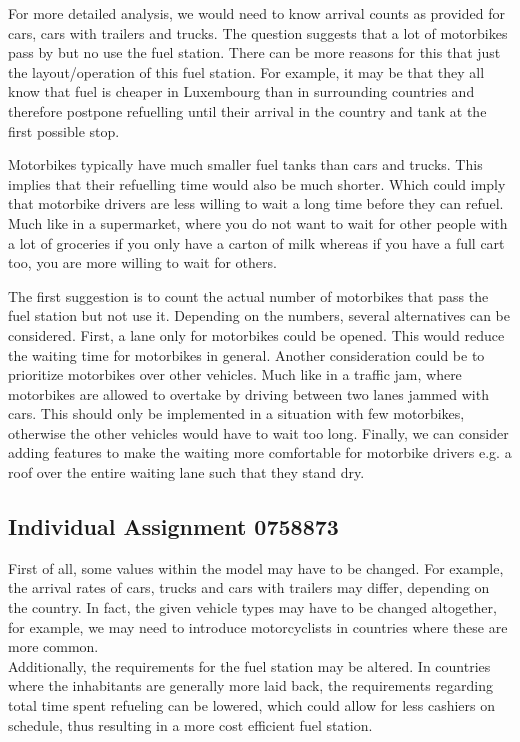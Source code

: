 For more detailed analysis, we would need to know arrival counts as provided for cars, cars with trailers and trucks.
The question suggests that a lot of motorbikes pass by but no use the fuel station.
There can be more reasons for this that just the layout/operation of this fuel station. 
For example, it may be that they all know that fuel is cheaper in Luxembourg than in surrounding countries and therefore postpone refuelling until their arrival in the country and tank at the first possible stop.

Motorbikes typically have much smaller fuel tanks than cars and trucks.
This implies that their refuelling time would also be much shorter.
Which could imply that motorbike drivers are less willing to wait a long time before they can refuel. 
Much like in a supermarket, where you do not want to wait for other people with a lot of groceries if you only have a carton of milk whereas if you have a full cart too, you are more willing to wait for others.

The first suggestion is to count the actual number of motorbikes that pass the fuel station but not use it.
Depending on the numbers, several alternatives can be considered.
First, a lane only for motorbikes could be opened.
This would reduce the waiting time for motorbikes in general.
Another consideration could be to prioritize motorbikes over other vehicles.
Much like in a traffic jam, where motorbikes are allowed to overtake by driving between two lanes jammed with cars.
This should only be implemented in a situation with few motorbikes, otherwise the other vehicles would have to wait too long.
Finally, we can consider adding features to make the waiting more comfortable for motorbike drivers e.g. a roof over the entire waiting lane such that they stand dry.
\newpage
\subsection{Individual Assignment 0758873}\label{app:indivramon}
First of all, some values within the model may have to be changed.
For example, the arrival rates of cars, trucks and cars with trailers may differ, depending on the country.
In fact, the given vehicle types may have to be changed altogether, for example, we may need to introduce motorcyclists in countries where these are more common. \\
Additionally, the requirements for the fuel station may be altered.
In countries where the inhabitants are generally more laid back, the requirements regarding total time spent refueling can be lowered, which could allow for less cashiers on schedule, thus resulting in a more cost efficient fuel station. \\

